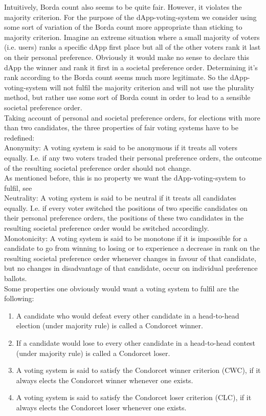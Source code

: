 Intuitively, Borda count also seems to be quite fair. However, it violates the majority criterion. For the purpose of the dApp-voting-system we consider using some sort of variation of the Borda count more appropriate than sticking to majority criterion. Imagine an extreme situation where a small majority of voters (i.e. users) ranks a specific dApp first place but all of the other voters rank it last on their personal preference. Obviously it would make no sense to declare this dApp the winner and rank it first in a societal preference order. Determining it's rank according to the Borda count seems much more legitimate. So the dApp-voting-system will not fulfil the majority criterion and will not use the plurality method, but rather use some sort of Borda count in order to lead to a sensible societal preference order. \\
Taking account of personal and societal preference orders, for elections with more than two candidates, the three properties of fair voting systems have to be redefined: \\
Anonymity: A voting system is said to be anonymous if it treats all voters equally. I.e. if any two voters traded their personal preference orders, the outcome of the resulting societal preference order should not change. \\
As mentioned before, this is no property we want the dApp-voting-system to fulfil, see \\ %
Neutrality: A voting system is said to be neutral if it treats all candidates equally. I.e. if every voter switched the positions of two specific candidates on their personal preference orders, the positions of these two candidates in the resulting societal preference order would be switched accordingly. \\
Monotonicity: A voting system is said to be monotone if it is impossible for a candidate to go from winning to losing or to experience a decrease in rank on the resulting societal preference order whenever changes in favour of that candidate, but no changes in disadvantage of that candidate, occur on individual preference ballots. \\
Some properties one obviously would want a voting system to fulfil are the following: \\
\begin{enumerate}
\item A candidate who would defeat every other candidate in a head-to-head election (under majority rule) is called a Condorcet winner. 
\item If a candidate would lose to every other candidate in a head-to-head contest (under majority rule) is called a Condorcet loser. 
\item A voting system is said to satisfy the Condorcet winner criterion (CWC), if it always elects the Condorcet winner whenever one exists.
\item A voting system is said to satisfy the Condorcet loser criterion (CLC), if it always elects the Condorcet loser whenever one exists. 
\end{enumerate}
